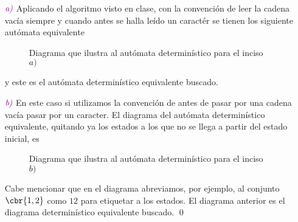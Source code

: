 \documentclass{article}
\begin{document}
\Proof 
\begin{itemize}
    \item[$\colemph{a)}$]
    Aplicando el algoritmo visto en clase, con la convención de leer la cadena vacía siempre y cuando antes se halla leído un caractér se tienen los siguiente autómata equivalente 
    \begin{figure}[h!]
        \centering 
        \caption{Diagrama que ilustra al autómata determinístico para el inciso $a)$}
    \end{figure}
    y este es el autómata determinístico equivalente buscado. 

    \item[$\colemph{b)}$] En este caso si utilizamos la convención de antes de pasar por una cadena vacía pasar por un caracter. El diagrama del autómata determinístico equivalente, quitando ya los estados a los que no se llega a partir del estado inicial, es
    \begin{figure}[h!]
        \centering 
        \caption{Diagrama que ilustra al autómata determinístico para el inciso $b)$}
    \end{figure}

    Cabe mencionar que en el diagrama abreviamos, por ejemplo, al conjunto $\cbr{1,2}$ como $12$ para etiquetar a los estados. El diagrama anterior es el diagrama determinístico equivalente buscado. \qed
\end{itemize}
\end{document}

